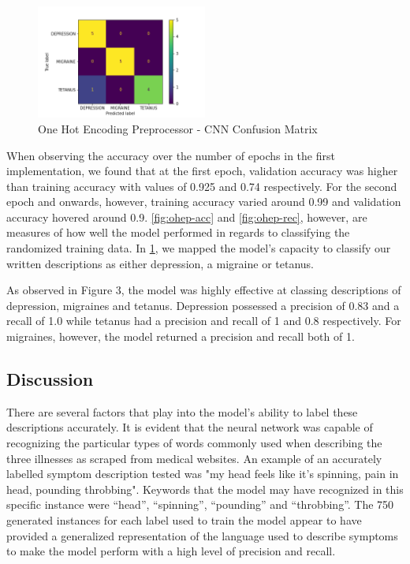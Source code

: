 \documentclass[12pt]{report}
\begin{document}
\begin{figure}[h!]
	\centering
	\includegraphics[width=0.5\textwidth]{confusion_matrix_ohe.png}
	\caption{One Hot Encoding Preprocessor - CNN Confusion Matrix}
	\label{fig:ohep-con}
\end{figure}

When observing the accuracy over the number of epochs in the first implementation,
we found that at the first epoch, validation accuracy was higher than training
accuracy with values of 0.925 and 0.74 respectively. For the second epoch and onwards,
however, training accuracy varied around 0.99 and validation accuracy hovered around
0.9. \ref{fig:ohep-acc} and \ref{fig:ohep-rec}, however, are measures of how well the model performed
in regards to classifying the randomized training data. In \ref{fig:ohep-con}, we mapped the
model's capacity to classify our written descriptions as either depression, a
migraine or tetanus.


As observed in Figure 3, the model was highly effective at classing descriptions of
depression, migraines and tetanus. Depression possessed a precision of 0.83 and a
recall of 1.0 while tetanus had a precision and recall of 1 and 0.8 respectively.
For migraines, however, the model returned a precision and recall both of 1.

\subsection{Discussion}
There are several factors that play into the model's ability to label these descriptions
accurately. It is evident that the neural network was capable of recognizing the particular
types of words commonly used when describing the three illnesses as scraped from medical
websites. An example of an accurately labelled symptom description tested was "my head
feels like it's spinning, pain in head, pounding throbbing". Keywords that the model
may have recognized in this specific instance were “head”, “spinning”, “pounding” and
“throbbing”. The 750 generated instances for each label used to train the model appear to
have provided a generalized representation of the language used to describe symptoms to make
the model perform with a high level of precision and recall.
\end{document}
